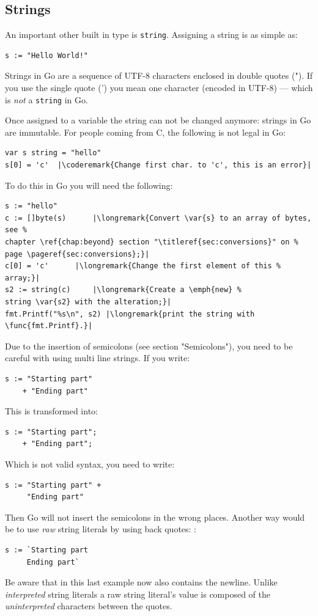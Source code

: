 \subsection{Strings}
An important other built in type is \lstinline{string}. Assigning a
string is as simple as:
\begin{lstlisting}
s := "Hello World!"
\end{lstlisting}
Strings in Go are a sequence of UTF-8 characters enclosed in double
quotes ("). If you use the single quote (') you mean one character
(encoded in UTF-8) --- which is \emph{not} a \lstinline{string} in Go.

Once assigned to a variable the string can not be changed anymore: strings in Go are
immutable. For
people coming from C, the following is not legal in Go:
\begin{lstlisting}
var s string = "hello"
s[0] = 'c'  |\coderemark{Change first char. to 'c', this is an error}|
\end{lstlisting}
To do this in Go you will need the following:
\begin{lstlisting}
s := "hello"
c := []byte(s)	    |\longremark{Convert \var{s} to an array of bytes, see %
chapter \ref{chap:beyond} section "\titleref{sec:conversions}" on %
page \pageref{sec:conversions};}|
c[0] = 'c'	    |\longremark{Change the first element of this %
array;}|
s2 := string(c)     |\longremark{Create a \emph{new} %
string \var{s2} with the alteration;}|
fmt.Printf("%s\n", s2) |\longremark{print the string with \func{fmt.Printf}.}|
\end{lstlisting}
\showremarks

\begin{lbar}
Due to the insertion of semicolons (see \cite{effective_go} section
"Semicolons"), you need to be careful with using multi line strings. If
you write:
\begin{lstlisting}
s := "Starting part"
    + "Ending part"
\end{lstlisting}
This is transformed into:
\begin{lstlisting}
s := "Starting part";
    + "Ending part";
\end{lstlisting}
Which is not valid syntax, you need to write:
\begin{lstlisting}
s := "Starting part" +
     "Ending part"
\end{lstlisting}
Then Go will not insert the semicolons in the wrong places. Another way
would be to use \emph{raw} string literals by using back quotes: :
\begin{lstlisting}
s := `Starting part
     Ending part`
\end{lstlisting}
Be aware that in this last example  now also contains the newline.
Unlike \emph{interpreted} string literals  a raw string literal's value
is composed of the \emph{uninterpreted} characters between the quotes.
\end{lbar}
